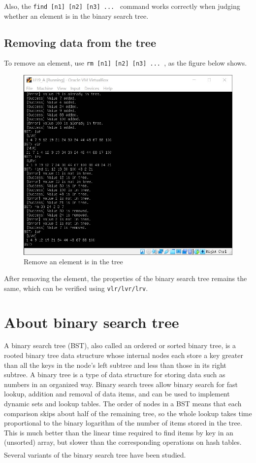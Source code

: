 \documentclass[cn,black,12pt,normal]{elegantnote}
\newcommand{\uct}[1]{\textsuperscript{\textsuperscript{\cite{#1}}}}
\begin{document}
Also, the \lstinline{find [n1] [n2] [n3] ... } command works correctly when judging whether an element is in the binary search tree.


\subsection{Removing data from the tree}
To remove an element, use \lstinline{rm [n1] [n2] [n3] ... }, as the figure below shows.
\begin{figure}[H]
    \centering
    \includegraphics[width=0.7\linewidth]{image/avl_05.jpg}
    \caption{Remove an element is in the tree}
\end{figure}
After removing the element, the properties of the binary search tree remains the same, which can be verified using \lstinline{vlr/lvr/lrv}.

\section{About binary search tree}

A binary search tree (BST), also called an ordered or sorted binary tree, is a rooted binary tree data structure whose internal nodes each store a key greater than all the keys in the node’s left subtree and less than those in its right subtree. A binary tree is a type of data structure for storing data such as numbers in an organized way. Binary search trees allow binary search for fast lookup, addition and removal of data items, and can be used to implement dynamic sets and lookup tables. The order of nodes in a BST means that each comparison skips about half of the remaining tree, so the whole lookup takes time proportional to the binary logarithm of the number of items stored in the tree. This is much better than the linear time required to find items by key in an (unsorted) array, but slower than the corresponding operations on hash tables. Several variants of the binary search tree have been studied.\uct{wiki:Binary_search_tree}
\end{document}
